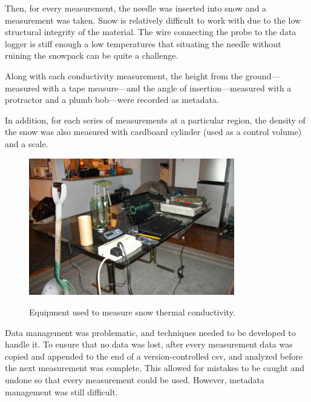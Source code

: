 Then, for every measurement, the needle was inserted into snow and a measurement
was taken. Snow is relatively difficult to work with due to the low structural 
integrity of the material.  The wire connecting the probe to the data logger is
stiff enough a low temperatures that situating the needle without ruining the
snowpack can be quite a challenge.

Along with each conductivity measurement, the height from the ground---measured
with a tape measure---and the angle of insertion---measured with a protractor
and a plumb bob---were recorded as metadata.

In addition, for each series of measurements at a particular region, the density
of the snow was also measured with cardboard cylinder (used as a control volume)
and a scale.

\begin{figure}[h]
\centering
\includegraphics[width=0.8\textwidth]{fig/equipment.jpg}
\label{fig:equipment}
\caption{Equipment used to measure snow thermal conductivity.}
\end{figure}

Data management was problematic, and techniques needed to be developed to handle
it. To ensure that no data was lost, after every measurement data was copied and
appended to the end of a version-controlled csv, and analyzed before the next
measurement was complete. This allowed for mistakes to be caught and undone so
that every measurement could be used. However, metadata management was still
difficult.

